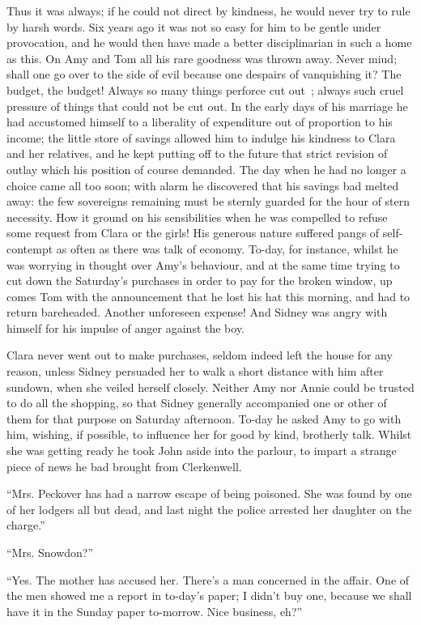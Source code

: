 Thus it was always; if he could not direct by kindness, he would never
try to rule by harsh words. Six years ago it was not so easy for him to
be gentle under provocation, and he would then have made a better
disciplinarian in such a home as this. On Amy and Tom all his rare
goodness was thrown away. Never miud; shall one go over to the side of
evil because one despairs of vanquishing it? The budget, the budget!
Always so many things perforce cut out~; always such cruel pressure of
things that could not be cut out. In the early days of his marriage he
had accustomed himself to a liberality of expenditure out of proportion
to his income; the little store of savings allowed him to indulge his
kindness to Clara and her relatives, and he kept putting off to the
future that strict revision of outlay which his position of course
demanded. The day when he had no longer a choice came all too soon; with
alarm he discovered that his {}savings bad melted away: the few
sovereigns remaining must be sternly guarded for the hour of stern
necessity. How it ground on his sensibilities when he was compelled to
refuse some request from Clara or the girls! His generous nature
suffered pangs of self-contempt as often as there was talk of economy.
To-day, for instance, whilst he was worrying in thought over Amy's
behaviour, and at the same time trying to cut down the Saturday's
purchases in order to pay for the broken window, up comes Tom with the
announcement that he lost his hat this morning, and had to return
bareheaded. Another unforeseen expense! And Sidney was angry with
himself for his impulse of anger against the boy.

Clara never went out to make purchases, seldom indeed left the house for
any reason, unless Sidney persuaded her to walk a short distance with
him after sundown, when she veiled herself closely. Neither Amy nor
Annie could be trusted to do all the shopping, so that Sidney generally
accompanied one or other of them for that purpose on Saturday afternoon.
To-day he asked Amy to go with him, wishing, if possible, to influence
her for good by kind, {}brotherly talk. Whilst she was getting ready he
took John aside into the parlour, to impart a strange piece of news he
bad brought from Clerkenwell.

``Mrs. Peckover has had a narrow escape of being poisoned. She was found
by one of her lodgers all but dead, and last night the police arrested
her daughter on the charge.''

``Mrs. Snowdon?''

``Yes. The mother has accused her. There's a man concerned in the
affair. One of the men showed me a report in to-day's paper; I didn't
buy one, because we shall have it in the Sunday paper to-morrow. Nice
business, eh?''

